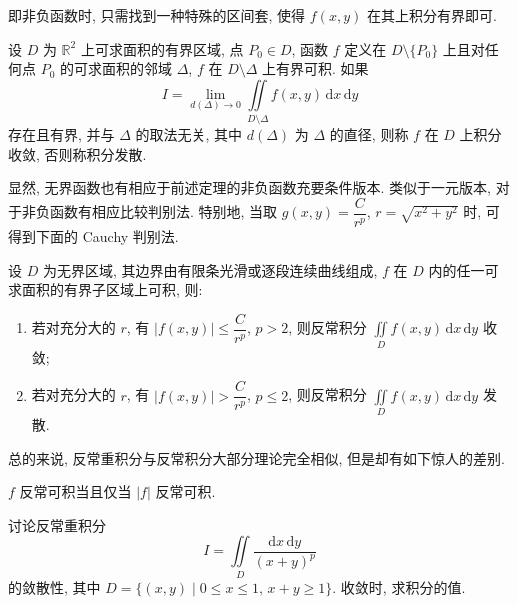 \begin{remark}
    即非负函数时, 只需找到一种特殊的区间套, 使得 $f(x,y)$ 在其上积分有界即可.
\end{remark}

\begin{definition}[无界函数]
    设 $D$ 为 $\mathbb{R}^2$ 上可求面积的有界区域, 点 $P_0\in D$, 函数 $f$ 定义在 $D\setminus\{P_0\}$ 上且对任何点 $P_0$ 的可求面积的邻域 $\Delta$, $f$ 在 $D\setminus\Delta$ 上有界可积. 如果
    \[
        I=\lim\limits_{d(\Delta)\to0}\iint\limits_{D\setminus\Delta}f(x,y)\,\mathrm{d}x\,\mathrm{d}y
    \]
    存在且有界, 并与 $\Delta$ 的取法无关, 其中 $d(\Delta)$ 为 $\Delta$ 的直径, 则称 $f$ 在 $D$ 上积分收敛, 否则称积分发散.
\end{definition}

\begin{remark}
    显然, 无界函数也有相应于前述定理的非负函数充要条件版本. 类似于一元版本, 对于非负函数有相应比较判别法. 特别地, 当取 $g(x,y)=\dfrac{C}{r^p}$, $r=\sqrt{x^2+y^2}$ 时, 可得到下面的 Cauchy 判别法.
\end{remark}

\begin{theorem}
    设 $D$ 为无界区域, 其边界由有限条光滑或逐段连续曲线组成, $f$ 在 $D$ 内的任一可求面积的有界子区域上可积, 则:
    \begin{enumerate}
        \item 若对充分大的 $r$, 有 $|f(x,y)|\leq\dfrac{C}{r^p}$, $p>2$, 则反常积分 $\displaystyle\iint\limits_Df(x,y)\,\mathrm{d}x\,\mathrm{d}y$ 收敛;
        \item 若对充分大的 $r$, 有 $|f(x,y)|>\dfrac{C}{r^p}$, $p\leq2$, 则反常积分 $\displaystyle\iint\limits_Df(x,y)\,\mathrm{d}x\,\mathrm{d}y$ 发散.
    \end{enumerate}
\end{theorem}

总的来说, 反常重积分与反常积分大部分理论完全相似, 但是却有如下惊人的差别.

\begin{theorem}[\markstar]
    $f$ 反常可积当且仅当 $|f|$ 反常可积.
\end{theorem}

\begin{example}
    讨论反常重积分
    \[
        I=\iint\limits_D\dfrac{\mathrm{d}x\,\mathrm{d}y}{(x+y)^p}
    \]
    的敛散性, 其中 $D=\{(x,y)\mid0\leq x\leq1,\,x+y\geq1\}$. 收敛时, 求积分的值.
\end{example}
\exampleblank

